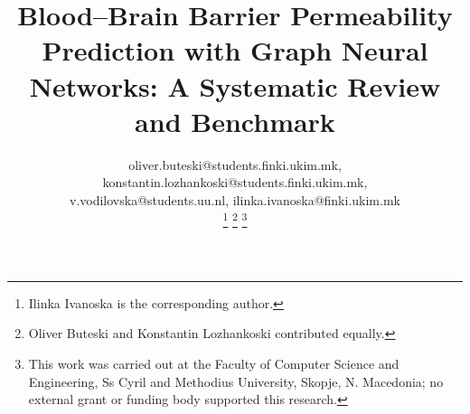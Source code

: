 \documentclass[conference]{IEEEtran}
\begin{document}
\title{Blood–Brain Barrier Permeability Prediction with Graph Neural Networks: A Systematic Review and Benchmark}

\author{



oliver.buteski@students.finki.ukim.mk, konstantin.lozhankoski@students.finki.ukim.mk, \\ v.vodilovska@students.uu.nl, ilinka.ivanoska@finki.ukim.mk

\thanks{Ilinka Ivanoska is the corresponding author.}
\thanks{Oliver Buteski and Konstantin Lozhankoski contributed equally.}
\thanks{This work was carried out at the Faculty of Computer Science and Engineering, Ss Cyril and Methodius University, Skopje, N. Macedonia; no external grant or funding body supported this research.}
}

\maketitle
\end{document}
